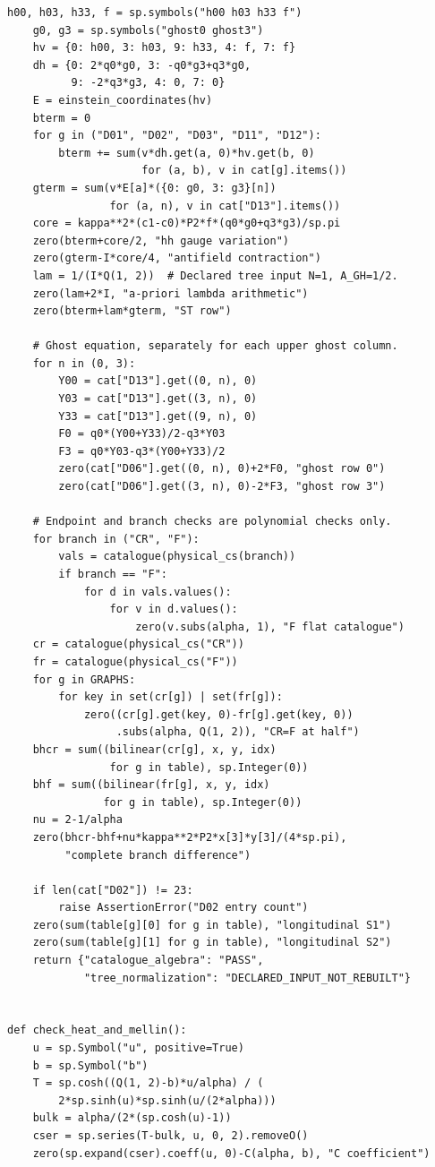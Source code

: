 \documentclass[11pt,a4paper]{article}
\theoremstyle{plain}
\theoremstyle{definition}
\theoremstyle{remark}
\numberwithin{equation}{section}
\begin{document}
\begin{lstlisting}[caption={Consolidated exact checker and coverage-aware optional replay.},
                  label={lst:program}]
    h00, h03, h33, f = sp.symbols("h00 h03 h33 f")
    g0, g3 = sp.symbols("ghost0 ghost3")
    hv = {0: h00, 3: h03, 9: h33, 4: f, 7: f}
    dh = {0: 2*q0*g0, 3: -q0*g3+q3*g0,
          9: -2*q3*g3, 4: 0, 7: 0}
    E = einstein_coordinates(hv)
    bterm = 0
    for g in ("D01", "D02", "D03", "D11", "D12"):
        bterm += sum(v*dh.get(a, 0)*hv.get(b, 0)
                     for (a, b), v in cat[g].items())
    gterm = sum(v*E[a]*({0: g0, 3: g3}[n])
                for (a, n), v in cat["D13"].items())
    core = kappa**2*(c1-c0)*P2*f*(q0*g0+q3*g3)/sp.pi
    zero(bterm+core/2, "hh gauge variation")
    zero(gterm-I*core/4, "antifield contraction")
    lam = 1/(I*Q(1, 2))  # Declared tree input N=1, A_GH=1/2.
    zero(lam+2*I, "a-priori lambda arithmetic")
    zero(bterm+lam*gterm, "ST row")

    # Ghost equation, separately for each upper ghost column.
    for n in (0, 3):
        Y00 = cat["D13"].get((0, n), 0)
        Y03 = cat["D13"].get((3, n), 0)
        Y33 = cat["D13"].get((9, n), 0)
        F0 = q0*(Y00+Y33)/2-q3*Y03
        F3 = q0*Y03-q3*(Y00+Y33)/2
        zero(cat["D06"].get((0, n), 0)+2*F0, "ghost row 0")
        zero(cat["D06"].get((3, n), 0)-2*F3, "ghost row 3")

    # Endpoint and branch checks are polynomial checks only.
    for branch in ("CR", "F"):
        vals = catalogue(physical_cs(branch))
        if branch == "F":
            for d in vals.values():
                for v in d.values():
                    zero(v.subs(alpha, 1), "F flat catalogue")
    cr = catalogue(physical_cs("CR"))
    fr = catalogue(physical_cs("F"))
    for g in GRAPHS:
        for key in set(cr[g]) | set(fr[g]):
            zero((cr[g].get(key, 0)-fr[g].get(key, 0))
                 .subs(alpha, Q(1, 2)), "CR=F at half")
    bhcr = sum((bilinear(cr[g], x, y, idx)
                for g in table), sp.Integer(0))
    bhf = sum((bilinear(fr[g], x, y, idx)
               for g in table), sp.Integer(0))
    nu = 2-1/alpha
    zero(bhcr-bhf+nu*kappa**2*P2*x[3]*y[3]/(4*sp.pi),
         "complete branch difference")

    if len(cat["D02"]) != 23:
        raise AssertionError("D02 entry count")
    zero(sum(table[g][0] for g in table), "longitudinal S1")
    zero(sum(table[g][1] for g in table), "longitudinal S2")
    return {"catalogue_algebra": "PASS",
            "tree_normalization": "DECLARED_INPUT_NOT_REBUILT"}


def check_heat_and_mellin():
    u = sp.Symbol("u", positive=True)
    b = sp.Symbol("b")
    T = sp.cosh((Q(1, 2)-b)*u/alpha) / (
        2*sp.sinh(u)*sp.sinh(u/(2*alpha)))
    bulk = alpha/(2*(sp.cosh(u)-1))
    cser = sp.series(T-bulk, u, 0, 2).removeO()
    zero(sp.expand(cser).coeff(u, 0)-C(alpha, b), "C coefficient")


\end{lstlisting}
\end{document}
